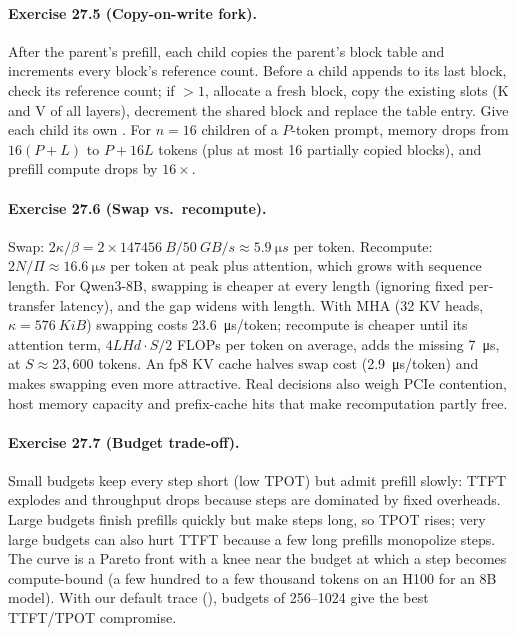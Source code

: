 \paragraph{Exercise 27.5 (Copy-on-write fork).}
After the parent's prefill, each child copies the parent's block table and increments every block's
reference count. Before a child appends to its last block, check its reference count; if $>1$, allocate a
fresh block, copy the existing slots (K and V of all layers), decrement the shared block and replace the
table entry. Give each child its own . For $n=16$ children of a $P$-token prompt,
memory drops from $16(P+L)$ to $P+16L$ tokens (plus at most 16 partially copied blocks), and prefill compute
drops by $16\times$.

\paragraph{Exercise 27.6 (Swap vs.\ recompute).}
Swap: $2\kappa/\beta=2\times\SI{147456}{B}/\SI{50}{GB/s}\approx\SI{5.9}{\micro s}$ per token. Recompute:
$2N/\Pi\approx\SI{16.6}{\micro s}$ per token at peak plus attention, which grows with sequence length.
For Qwen3-8B, swapping is cheaper at every length (ignoring fixed per-transfer latency), and the gap widens
with length. With MHA (32 KV heads, $\kappa=\SI{576}{KiB}$) swapping costs \SI{23.6}{\micro s}/token; recompute
is cheaper until its attention term, $4LHd\cdot S/2$ FLOPs per token on average, adds the missing
\SI{7}{\micro s}, at $S\approx23{,}600$ tokens. An fp8 KV cache halves swap cost (\SI{2.9}{\micro s}/token) and
makes swapping even more attractive. Real decisions also weigh PCIe contention, host memory capacity and
prefix-cache hits that make recomputation partly free.

\paragraph{Exercise 27.7 (Budget trade-off).}
Small budgets keep every step short (low TPOT) but admit prefill slowly: TTFT explodes and throughput drops
because steps are dominated by fixed overheads. Large budgets finish prefills quickly but make steps
long, so TPOT rises; very large budgets can also hurt TTFT because a few long prefills monopolize steps.
The curve is a Pareto front with a knee near the budget at which a step becomes compute-bound
(a few hundred to a few thousand tokens on an H100 for an 8B model). With our default trace
(), budgets of 256--1024 give the best TTFT/TPOT compromise.

